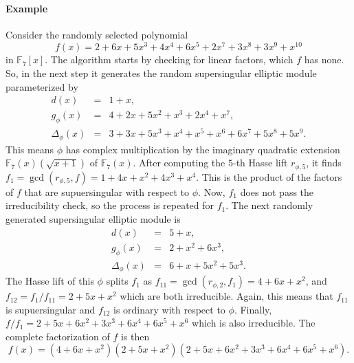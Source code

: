 \documentclass[12pt]{article}
\theoremstyle{plain}
\theoremstyle{definition}
\def\F{\ensuremath{\mathbb{F}}}
\begin{document}
\paragraph{Example}
Consider the randomly selected polynomial 
\[ f(x) = 2 + 6x + 5x^3 + 4x^4 + 6x^5 + 2x^7 + 3x^8 + 3x^9 + x^{10} \]
in $\F_7[x]$. The algorithm starts by checking for linear factors, which $f$ has none. So, in the 
next step it generates the random supersingular elliptic module parameterized by
\[
\begin{array}{rll}
	d(x) & = & 1 + x, \\
	g_\phi(x) & = & 4 + 2x + 5x^2 + x^3 + 2x^4 + x^7, \\
	\Delta_\phi(x) & = & 3 + 3x + 5x^3 + x^4 + x^5 + x^6 + 6x^7 + 5x^8 + 5x^9.
\end{array}
\]
This means $\phi$ has complex multiplication by the imaginary quadratic extension $\F_7(x)(\sqrt{x 
+ 1})$ of $\F_7(x)$. After computing the $5$-th Hasse lift $r_{\phi, 5}$, it finds $f_1 = 
\gcd(r_{\phi, 5}, f) = 1 + 4x + x^2 + 4x^3 + x^4$. This is the product of the factors of $f$ that 
are supuersingular with respect to $\phi$. Now, $f_1$ does not pass the irreducibility check, so 
the process is repeated for $f_1$. The next randomly generated supersingular elliptic module is
\[
\begin{array}{rll}
	d(x) & = & 5 + x, \\
	g_\phi(x) & = & 2 + x^2 + 6x^3, \\
	\Delta_\phi(x) & = & 6 + x + 5x^2 + 5x^3.
\end{array}
\]
The Hasse lift of this $\phi$ splits $f_1$ as $f_{11} = \gcd(r_{\phi, 2}, f_1) = 4 + 6x + x^2$, and 
$f_{12} = f_1 / f_{11} = 2 + 5x + x^2$ which are both irreducible. Again, this means that $f_{11}$ 
is supuersingular and $f_{12}$ is ordinary with respect to $\phi$. Finally, $f / f_1 = 2 + 5x + 
6x^2 + 3x^3 + 6x^4 + 6x^5 + x^6$ which is also irreducible. The complete factorization of $f$ is 
then \[ f(x) = (4 + 6x + x^2)(2 + 5x + x^2)(2 + 5x + 6x^2 + 3x^3 + 6x^4 + 6x^5 + x^6).\]




\end{document}

